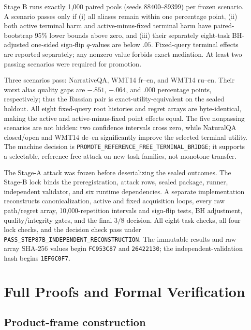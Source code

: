 Stage B runs exactly 1,000 paired pools (seeds 88400--89399) per frozen scenario. A scenario passes only if (i) all aliases remain within one percentage point, (ii) both active terminal harm and active-minus-fixed terminal harm have paired-bootstrap 95\% lower bounds above zero, and (iii) their separately eight-task BH-adjusted one-sided sign-flip $q$-values are below $.05$. Fixed-query terminal effects are reported separately; any nonzero value forbids exact mediation. At least two passing scenarios were required for promotion.



Three scenarios pass: NarrativeQA, WMT14 fr--en, and WMT14 ru--en. Their worst alias quality gaps are $-.851$, $-.064$, and $.000$ percentage points, respectively; thus the Russian pair is exact-utility-equivalent on the sealed holdout. All eight fixed-query root histories and regret arrays are byte-identical, making the active and active-minus-fixed point effects equal. The five nonpassing scenarios are not hidden: two confidence intervals cross zero, while NaturalQA closed/open and WMT14 de--en significantly improve the selected terminal utility. The machine decision is \texttt{PROMOTE\_REFERENCE\_FREE\_TERMINAL\_BRIDGE}; it supports a selectable, reference-free attack on new task families, not monotone transfer.

The Stage-A attack was frozen before deserializing the sealed outcomes. The Stage-B lock binds the preregistration, attack rows, sealed package, runner, independent validator, and six runtime dependencies. A separate implementation reconstructs canonicalization, active and fixed acquisition loops, every raw path/regret array, 10,000-repetition intervals and sign-flip tests, BH adjustment, quality/integrity gates, and the final $3/8$ decision. All eight task checks, all four lock checks, and the decision check pass under \texttt{PASS\_STEP87B\_INDEPENDENT\_RECONSTRUCTION}. The immutable results and raw-array SHA-256 values begin \texttt{FC953C87} and \texttt{26422130}; the independent-validation hash begins \texttt{1EF6C0F7}.

\section{Full Proofs and Formal Verification}
\label{app:proofs}

\subsection{Product-frame construction}

